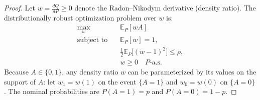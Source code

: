 \begin{proof}
Let $w = \frac{dQ}{dP} \ge 0$ denote the Radon--Nikodym derivative (density ratio). The distributionally robust optimization problem over $w$ is:
\begin{align}
    \max_{w} \quad & \mathbb{E}_P[w A] \\
    \text{subject to} \quad & \mathbb{E}_P[w] = 1, \label{eq:dro_norm} \\
    & \frac{1}{2} \mathbb{E}_P\big[(w - 1)^2\big] \le \rho, \label{eq:dro_chi2} \\
    & w \ge 0 \quad P\text{-a.s.} \label{eq:dro_nonneg}
\end{align}
Because $A \in \{0, 1\}$, any density ratio $w$ can be parameterized by its values on the support of $A$: let $w_1 = w(1)$ on the event $\{A = 1\}$ and $w_0 = w(0)$ on $\{A = 0\}$. The nominal probabilities are $P(A = 1) = p$ and $P(A = 0) = 1 - p$.


\end{proof}
